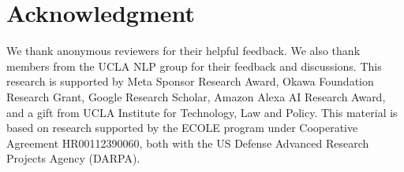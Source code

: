 \section{Acknowledgment}

We thank anonymous reviewers for their helpful
feedback. We also thank members from the UCLA NLP group for their
feedback and discussions. This research is supported by Meta Sponsor Research Award, Okawa Foundation Research Grant, Google Research Scholar, Amazon Alexa AI Research Award, and a gift from UCLA Institute for Technology, Law and Policy. This material is based on research supported by the ECOLE program under Cooperative Agreement HR00112390060, both with the US Defense Advanced Research Projects Agency (DARPA).
